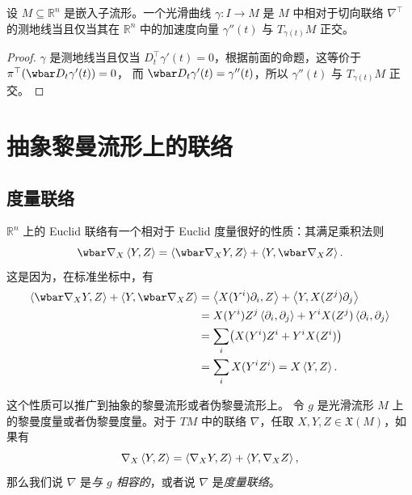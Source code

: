 \begin{corollary}
  设 $M\subseteq \mathbb{R}^n$ 是嵌入子流形。一个光滑曲线 $\gamma:I\to M$
  是 $M$ 中相对于切向联络 $\nabla^\top$ 的测地线当且仅当其在 $\mathbb{R}^n$ 中的加速度向量
   $\gamma''(t)$ 与 $T_{\gamma(t)}M$ 正交。
\end{corollary}
\begin{proof}
  $\gamma$ 是测地线当且仅当 $D_t^\top \gamma'(t)=0$，根据前面的命题，这等价于 $\pi^\top(\wbar D_t\gamma'(t))=0$，
  而 $\wbar D_t\gamma'(t)=\gamma''(t)$，所以 $\gamma''(t)$ 与 $T_{\gamma(t)}M$ 正交。
\end{proof}





\section{抽象黎曼流形上的联络}

\subsection{度量联络}

$\mathbb{R}^n$ 上的 Euclid 联络有一个相对于 Euclid 度量很好的性质：其满足乘积法则
\[
  \wbar\nabla_X\inn{Y,Z}=\inn{\wbar\nabla_XY,Z}+\inn{Y,\wbar\nabla_XZ}.
\]
这是因为，在标准坐标中，有 
\begin{align*}
  \inn{\wbar\nabla_XY,Z}+\inn{Y,\wbar\nabla_XZ}&=
  \inn{X(Y^i)\partial_i,Z}+\inn{Y,X(Z^j)\partial_j}\\
  &=X(Y^i)Z^j\inn{\partial_i,\partial_j}+
  Y^iX(Z^j)\inn{\partial_i,\partial_j}\\
  &=\sum_{i}\bigl(X(Y^i)Z^i+Y^iX(Z^i)\bigr)\\
  &=\sum_i X(Y^iZ^i)=X\inn{Y,Z}.
\end{align*}

这个性质可以推广到抽象的黎曼流形或者伪黎曼流形上。
令 $g$ 是光滑流形 $M$ 上的黎曼度量或者伪黎曼度量。对于 $TM$ 中的联络
$\nabla$，任取 $X,Y,Z\in \mathfrak{X}(M)$，如果有
\begin{equation}
  \nabla_X\left\langle Y,Z\right\rangle=\left\langle \nabla_XY,Z\right\rangle+\left\langle Y,\nabla_XZ\right\rangle,
\end{equation}
那么我们说 $\nabla$ 是\emph{与 $g$ 相容的}，或者说 $\nabla$ 是\emph{度量联络}。


